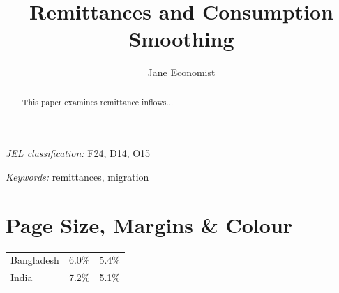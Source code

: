 \documentclass[11pt,a4paper]{article}
\title{Remittances and Consumption Smoothing}
\author{Jane Economist}
\newcommand{\JEL}[1]{\par\noindent\textit{JEL classification:} #1}
\newcommand{\keywords}[1]{\par\noindent\textit{Keywords:} #1}
\begin{document}
\maketitle

\begin{abstract}
This paper examines remittance inflows...
\end{abstract}
\JEL{F24, D14, O15}
\keywords{remittances, migration}

\bigskip
\section*{Page Size, Margins \& Colour}
\begin{center}
\begin{tabular}{lcc}
  Bangladesh & 6.0\% & 5.4\% \\
  India & 7.2\% & 5.1\% \\
\end{tabular}
\end{center}
\end{document}
